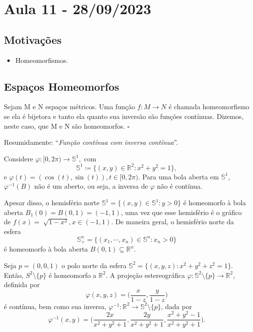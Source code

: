 \documentclass[metric_notes.tex]{subfiles}
\begin{document}
\section{Aula 11 - 28/09/2023}
\subsection{Motivações}
\begin{itemize}
	\item Homeomorfismos.
\end{itemize}
\subsection{Espaços Homeomorfos}
\begin{def*}
	Sejam M e N espaços métricos. Uma função \(f:M\rightarrow N\) é chamada homeomorfismo se
	ela é bijetora e tanto ela quanto sua inversão são funções contínuas. Dizemos, neste caso, que M e N
	são homeomorfos. \(\square\)
\end{def*}
Resumidamente: ``\textit{Função contínua com inversa contínua}''.
\begin{example}
	Considere \(\varphi :[0, 2\pi )\rightarrow \mathbb{S}^{1},\) com
	\[
		\mathbb{S}^{1}\coloneqq \{(x, y)\in \mathbb{R}^{2}: x^{2}+y^{2}=1\},
	\]
	e \(\varphi (t) = (\cos{(t)}, \sin{(t)}), t\in[0, 2\pi ).\) Para uma bola aberta em
	\(\mathbb{S}^{1}\), \(\varphi ^{-1}(B)\) não é um aberto, ou seja, a inversa
	de \(\varphi \) não é contínua.

	Apesar disso, o hemisfério norte \(\mathbb{S}^{1}=\{(x, y)\in \mathbb{S}^{1}: y > 0\}\) é
	homeomorfo à bola aberta \(B_{1}(0) = B(0, 1) = (-1, 1)\), uma vez que esse hemisfério é o gráfico
	de \(f(x) = \sqrt[]{1-x^{2}}, x\in (-1, 1).\) De maneira geral, o hemisfério norte
	da esfera
	\[
		\mathbb{S}_{+}^{n} = \{(x_{1}, \cdots, x_{n})\in \mathbb{S}^{n}: x_{n}>0\}
	\]
	é homeomorfo à bola aberta \(B(0, 1)\subseteq{\mathbb{R}^{n}}\).
\end{example}
\begin{example}
	Seja \(p=(0, 0, 1)\) o polo norte da esfera \(\mathbb{S}^{2}=\{(x, y, z): x^{2}+y^{2}+z^{2}=1\}\). Então,
	\(S^{2}\setminus\{p\}\) é homeomorfo a \(\mathbb{R}^{2}.\) A projeção estereográfica
	\(\varphi :\mathbb{S}^{2}\setminus\{p\}\rightarrow \mathbb{R}^{2}\), definida por
	\[
		\varphi (x, y, z) = \biggl(\frac{x}{1-z}, \frac{y}{1-z}\biggr)
	\]
	é contínua, bem como sua inversa, \(\varphi ^{-1}:\mathbb{R}^{2}\rightarrow \mathbb{S}^{2}\setminus\{p\}\), dada por
	\[
		\varphi ^{-1}(x, y) = \biggl(\frac{2x}{x^{2}+y^{2}+1}, \frac{2y}{x^{2}+y^{2}+1}, \frac{x^{2}+y^{2}-1}{x^{2}+y^{2}+1}\biggr).
	\]
\end{example}
\end{document}
